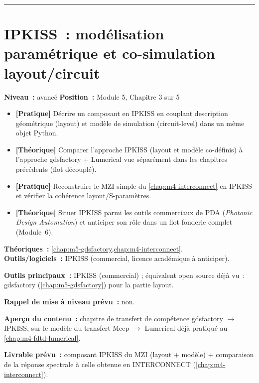 \bigskip\hrule\bigskip

\chapter{IPKISS~: modélisation paramétrique et co-simulation layout/circuit}
\label{chap:m5-ipkiss}

\noindent\textbf{Niveau~:} avancé \hfill \textbf{Position~:} Module 5, Chapitre 3 sur 5

\begin{objectifs}
\begin{itemize}[leftmargin=1.4em]
  \item \textbf{[Pratique]} Décrire un composant en IPKISS en couplant description géométrique (layout) et modèle de simulation (circuit-level) dans un même objet Python.
  \item \textbf{[Théorique]} Comparer l'approche IPKISS (layout et modèle co-définis) à l'approche gdsfactory + Lumerical vue séparément dans les chapitres précédents (flot découplé).
  \item \textbf{[Pratique]} Reconstruire le MZI simple du \cref{chap:m4-interconnect} en IPKISS et vérifier la cohérence layout/S-paramètres.
  \item \textbf{[Théorique]} Situer IPKISS parmi les outils commerciaux de PDA (\emph{Photonic Design Automation}) et anticiper son rôle dans un flot fonderie complet (Module~6).
\end{itemize}
\end{objectifs}

\begin{prerequis}
\textbf{Théoriques~:} \cref{chap:m5-gdsfactory,chap:m4-interconnect}.\\
\textbf{Outils/logiciels~:} IPKISS (commercial, licence académique à anticiper).
\end{prerequis}

\noindent\textbf{Outils principaux~:} IPKISS (commercial) ; équivalent open source déjà vu~: gdsfactory (\cref{chap:m5-gdsfactory}) pour la partie layout.

\noindent\textbf{Rappel de mise à niveau prévu~:} non.

\noindent\textbf{Aperçu du contenu~:} chapitre de transfert de compétence gdsfactory $\to$ IPKISS, sur le modèle du transfert Meep $\to$ Lumerical déjà pratiqué au \cref{chap:m4-fdtd-lumerical}.

\noindent\textbf{Livrable prévu~:} composant IPKISS du MZI (layout + modèle) + comparaison de la réponse spectrale à celle obtenue en INTERCONNECT (\cref{chap:m4-interconnect}).

